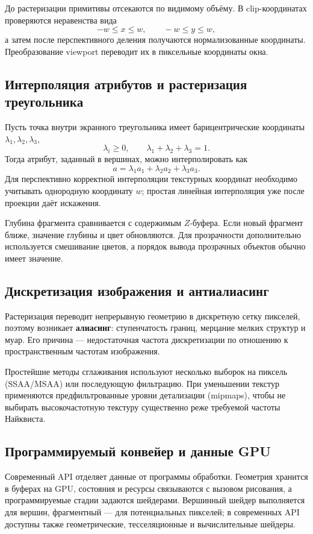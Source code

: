 До растеризации примитивы отсекаются по видимому объёму. В clip-координатах
проверяются неравенства вида
\[
-w\le x\le w,\qquad -w\le y\le w,
\]
а затем после перспективного деления получаются нормализованные координаты.
Преобразование viewport переводит их в пиксельные координаты окна.

\subsection{Интерполяция атрибутов и растеризация треугольника}

Пусть точка внутри экранного треугольника имеет барицентрические координаты
$\lambda_1,\lambda_2,\lambda_3$,
\[
\lambda_i\ge0,\qquad \lambda_1+\lambda_2+\lambda_3=1.
\]
Тогда атрибут, заданный в вершинах, можно интерполировать как
\[
a=\lambda_1a_1+\lambda_2a_2+\lambda_3a_3.
\]
Для перспективно корректной интерполяции текстурных координат необходимо
учитывать однородную координату $w$; простая линейная интерполяция уже после
проекции даёт искажения.

Глубина фрагмента сравнивается с содержимым $Z$-буфера. Если новый фрагмент
ближе, значение глубины и цвет обновляются. Для прозрачности дополнительно
используется смешивание цветов, а порядок вывода прозрачных объектов обычно
имеет значение.

\subsection{Дискретизация изображения и антиалиасинг}

Растеризация переводит непрерывную геометрию в дискретную сетку пикселей,
поэтому возникает \textbf{алиасинг}: ступенчатость границ, мерцание мелких
структур и муар. Его причина --- недостаточная частота дискретизации по
отношению к пространственным частотам изображения.

Простейшие методы сглаживания используют несколько выборок на пиксель
(SSAA/MSAA) или последующую фильтрацию. При уменьшении текстур применяются
предфильтрованные уровни детализации (mipmaps), чтобы не выбирать высокочастотную
текстуру существенно реже требуемой частоты Найквиста.

\subsection{Программируемый конвейер и данные GPU}

Современный API отделяет данные от программы обработки. Геометрия хранится в
буферах на GPU, состояния и ресурсы связываются с вызовом рисования, а
программируемые стадии задаются шейдерами. Вершинный шейдер выполняется для
вершин, фрагментный --- для потенциальных пикселей; в современных API доступны
также геометрические, тесселяционные и вычислительные шейдеры.

